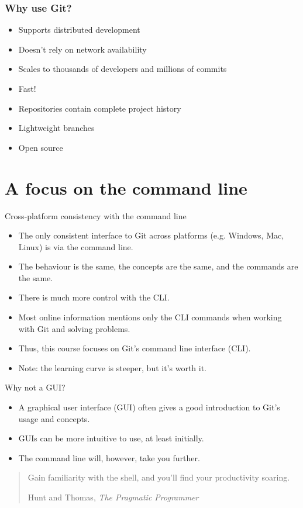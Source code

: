 \documentclass{git_course}
\begin{document}
\begin{frame}
    \frametitle{Why use Git?}
    \begin{itemize}
        \item Supports distributed development
        \item Doesn't rely on network availability
        \item Scales to thousands of developers and millions of commits
        \item Fast!
        \item Repositories contain complete project history
        \item Lightweight branches
        \item Open source
    \end{itemize}
\end{frame}

\section{A focus on the command line}

\begin{frame}{Cross-platform consistency with the command line}
    \begin{itemize}
        \item The only consistent interface to Git across platforms (e.g.
            Windows, Mac, Linux) is via the command line.
        \item The behaviour is the same, the concepts are the same, and the
            commands are the same.
        \item There is much more control with the CLI.
        \item Most online information mentions only the CLI commands when
            working with Git and solving problems.
        \item Thus, this course focuses on Git's command line interface
            (CLI).
        \item Note: the learning curve is steeper, but it's worth it.
    \end{itemize}
\end{frame}

\begin{frame}{Why not a GUI?}
    \begin{itemize}
        \item A graphical user interface (GUI) often gives a good
            introduction to Git's usage and concepts.
        \item GUIs can be more intuitive to use, at least initially.
        \item The command line will, however, take you further.
    \end{itemize}

    \blockquote[Hunt and Thomas, \emph{The Pragmatic Programmer}]
    {Gain familiarity with the shell, and you'll find your productivity soaring.}
\end{frame}
\end{document}
